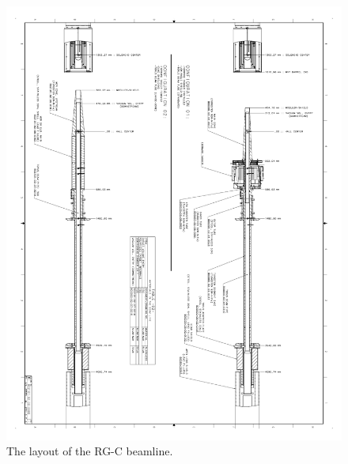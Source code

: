 \documentclass[12pt]{article}
\begin{document}
\begin{figure}[hbt]
\vspace{-2cm}
\begin{center}
\includegraphics[width=6in]{rgc_beam_page3.pdf}
\end{center}
\caption{ \label{fig:beamline3} 
The layout of the RG-C beamline. }
\end{figure}
\end{document}
